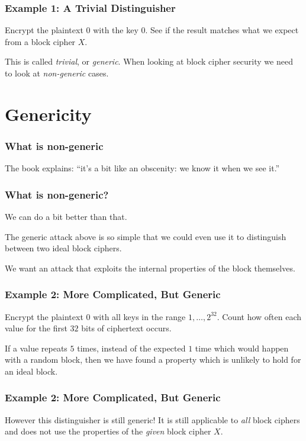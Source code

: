 \documentclass{beamer}
\newcommand{\<}{\langle}
\renewcommand{\>}{\rangle}
\begin{document}
\begin{frame}
\frametitle{Example 1: A Trivial Distinguisher}

Encrypt the plaintext $0$ with the key $0$. See if the result matches what we expect from a block cipher $X$.\newline

This is called \emph{trivial}, or \emph{generic}. When looking at block cipher security we need to look at \emph{non-generic} cases.
\end{frame}


\section{Genericity}
\begin{frame}
\frametitle{What is non-generic}

The book explains: ``it's a bit like an obscenity: we know it when we see it.''
\end{frame}

\begin{frame}
\frametitle{What is non-generic?}

We can do a bit better than that. \newline

The generic attack above is so simple that we could even use it to distinguish between two ideal block ciphers. \newline

We want an attack that exploits the internal properties of the block themselves.
\end{frame}


\begin{frame}
\frametitle{Example 2: More Complicated, But Generic}

Encrypt the plaintext $0$ with all keys in the range $1, \dots, 2^{32}$. Count how often each value for the first $32$ bits of ciphertext occurs. \newline

If a value repeats $5$ times, instead of the expected $1$ time which would happen with a random block, then we have found a property which is unlikely to hold for an ideal block.
\end{frame}


\begin{frame}
\frametitle{Example 2: More Complicated, But Generic}

However this distinguisher is still generic! It is still applicable to \emph{all} block ciphers and does not use the properties of the \emph{given} block cipher $X$.
\end{frame}
\end{document}
